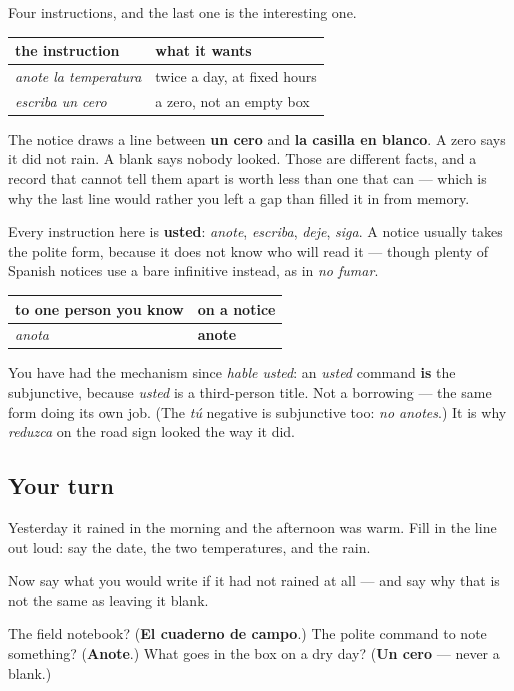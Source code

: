 \begin{grammarlens}[title={Grammar Lens: a zero is not a blank}]
Four instructions, and the last one is the interesting one.

\noindent
\begin{tabularx}{\linewidth}{@{}>{\raggedright\arraybackslash}X>{\raggedright\arraybackslash}X@{}}
\toprule
\textbf{the instruction} & \textbf{what it wants} \\
\midrule
\emph{anote la temperatura} & twice a day, at fixed hours \\
\emph{escriba un cero} & a zero, not an empty box \\
\bottomrule
\end{tabularx}

The notice draws a line between \textbf{un cero} and \textbf{la casilla en blanco}. A zero says it did not rain. A blank says nobody looked. Those are different facts, and a record that cannot tell them apart is worth less than one that can — which is why the last line would rather you left a gap than filled it in from memory.
\end{grammarlens}

\begin{grammarlens}[title={Grammar Lens: anote, not anota}]
Every instruction here is \textbf{usted}: \emph{anote}, \emph{escriba}, \emph{deje}, \emph{siga}. A notice usually takes the polite form, because it does not know who will read it — though plenty of Spanish notices use a bare infinitive instead, as in \emph{no fumar}.

\noindent
\begin{tabularx}{\linewidth}{@{}>{\raggedright\arraybackslash}X>{\raggedright\arraybackslash}X@{}}
\toprule
\textbf{to one person you know} & \textbf{on a notice} \\
\midrule
\emph{anota} & \textbf{anote} \\
\bottomrule
\end{tabularx}

You have had the mechanism since \emph{hable usted}: an \emph{usted} command \textbf{is} the subjunctive, because \emph{usted} is a third-person title. Not a borrowing — the same form doing its own job. (The \emph{tú} negative is subjunctive too: \emph{no anotes}.) It is why \emph{reduzca} on the road sign looked the way it did.
\end{grammarlens}

\subsection*{Your turn}
Yesterday it rained in the morning and the afternoon was warm. Fill in the line out loud: say the date, the two temperatures, and the rain.

Now say what you would write if it had not rained at all — and say why that is not the same as leaving it blank.

\begin{tcolorbox}[breakable,colback=teal!4,colframe=teal!35!black,title={Before you move on}]
The field notebook? (\textbf{El cuaderno de campo}.) The polite command to note something? (\textbf{Anote}.) What goes in the box on a dry day? (\textbf{Un cero} — never a blank.)
\end{tcolorbox}
